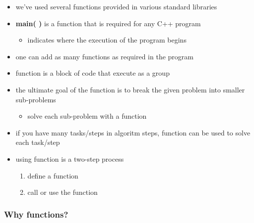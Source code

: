 \documentclass[11pt]{article}
\providecommand{\tightlist}{%
      \setlength{\itemsep}{0pt}\setlength{\parskip}{0pt}}
\begin{document}
\begin{itemize}
\tightlist
\item
  we've used several functions provided in various standard libraries
\item
  \textbf{main( )} is a function that is required for any C++ program

  \begin{itemize}
  \tightlist
  \item
    indicates where the execution of the program begins
  \end{itemize}
\item
  one can add as many functions as required in the program
\item
  function is a block of code that execute as a group
\item
  the ultimate goal of the function is to break the given problem into
  smaller sub-problems

  \begin{itemize}
  \tightlist
  \item
    solve each sub-problem with a function
  \end{itemize}
\item
  if you have many tasks/steps in algoritm steps, function can be used
  to solve each task/step
\item
  using function is a two-step process

  \begin{enumerate}
  \def\labelenumi{\arabic{enumi}.}
  \tightlist
  \item
    define a function
  \item
    call or use the function
  \end{enumerate}
\end{itemize}

\hypertarget{why-functions}{%
\subsubsection{Why functions?}\label{why-functions}}
\end{document}
